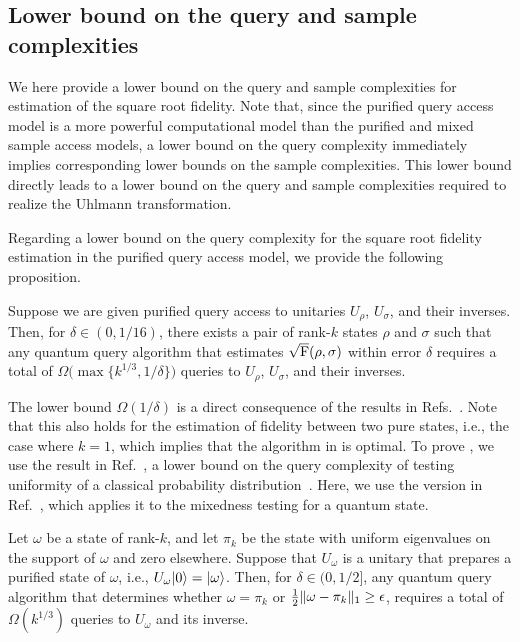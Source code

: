 \subsection{Lower bound on the query and sample complexities}
\label{sec:lower bound}


We here provide a lower bound on the query and sample complexities for estimation of the square root fidelity. Note that, since the purified query access model is a more powerful computational model than the purified and mixed sample access models, a lower bound on the query complexity immediately implies corresponding lower bounds on the sample complexities. This lower bound directly leads to a lower bound on the query and sample complexities required to realize the Uhlmann transformation.


Regarding a lower bound on the query complexity for the square root fidelity estimation in the purified query access model, we provide the following proposition.
\begin{proposition}
\label{prop:lower fidelity est}
Suppose we are given purified query access to unitaries $U_\rho$, $U_\sigma$, and their inverses.
Then, for $\delta \in (0, 1/16)$, there exists a pair of rank-$k$ states $\rho$ and $\sigma$ such that any quantum query algorithm that estimates $\sqrt{{\mathrm{F}}}(\rho, \sigma)$ within error $\delta$ requires a total of $\Omega\big(\max\big\{k^{1/3}, 1/\delta\big\}\big)$ queries to $U_\rho$, $U_\sigma$, and their inverses.
\end{proposition}




The lower bound $\Omega(1/\delta)$ is a direct consequence of the results in Refs.~\cite{belovs2019ClassicalDist, Wang2024OptimalFidelityPure, luo2024SuccinctTest, Liu2024geometricmean}. Note that this also holds for the estimation of fidelity between two pure states, i.e., the case where $k=1$, which implies that the algorithm in  is optimal.
To prove , we use the result in Ref.~\cite{chakraborty2010NewResultQPT}, a lower bound on the query complexity of testing uniformity of a classical probability distribution~\cite{bravi2011PropTest}.
Here, we use the version in Ref.~\cite{Liu2025EstimationTrace}, which applies it to the mixedness testing for a quantum state.





\begin{theorem}
\label{lem:query lower}
Let $\omega$ be a state of rank-$k$, and let $\pi_k$ be the state with uniform eigenvalues on the support of $\omega$ and zero elsewhere.
Suppose that $U_\omega$ is a unitary that prepares a purified state of $\omega$, i.e., $U_\omega|0\rangle = |\omega\rangle$.
Then, for $\delta \in (0, 1/2]$, any quantum query algorithm that determines whether $\omega = \pi_k$ or $\frac{1}{2}\|\omega - \pi_k\|_1 \geq \epsilon$, requires a total of $\Omega(k^{1/3})$ queries to $U_\omega$ and its inverse.
\end{theorem}

